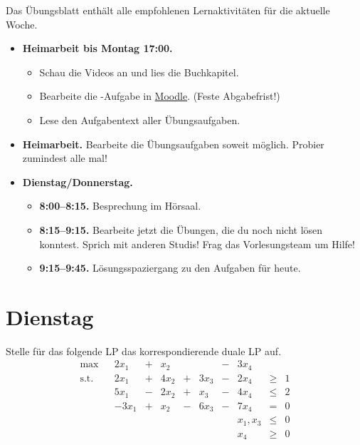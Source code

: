 \documentclass{uebung_cs}
\begin{document}
Das Übungsblatt enthält alle empfohlenen Lernaktivitäten für die aktuelle Woche.

\begin{itemize}
\item \textbf{Heimarbeit bis Montag 17:00.}
    \begin{itemize}
    \item 
    Schau die Videos an und lies die Buchkapitel.
    \item Bearbeite die -Aufgabe in \href{https://moodle.studiumdigitale.uni-frankfurt.de/moodle/course/view.php?id=2241}{Moodle}. (Feste Abgabefrist!)
    \item Lese den Aufgabentext aller Übungsaufgaben.
    \end{itemize}
\item \textbf{Heimarbeit.} Bearbeite die Übungsaufgaben soweit möglich. Probier zumindest alle mal!
\item \textbf{Dienstag/Donnerstag.}
\begin{itemize}
    \item \textbf{8:00--8:15.} Besprechung im Hörsaal.
    \item \textbf{8:15--9:15.} Bearbeite jetzt die Übungen, die du noch nicht lösen konntest. Sprich mit anderen Studis! Frag das Vorlesungsteam um Hilfe!
    \item \textbf{9:15--9:45.} Lösungsspaziergang zu den Aufgaben für heute.
\end{itemize}
\end{itemize}

\section*{Dienstag}

\begin{aufgabe}
	Stelle für das folgende \acs{LP} das korrespondierende duale \acs{LP} auf.
	\[
		\begin{array}{rrrlllllllll}
		\text{max}    &     &   2 x_1       &   +     &   x_2   &       &         &   -   & 3x_4  &         &   \\
		\text{s.t.}  &     &   2x_1      &   +     &   4x_2  &   +   &  3 x_3   &   -   & 2x_4   &  \geq   & 1 \\
							&     &   5x_1      &   -     &   2x_2   &   +   &   x_3  &   -   & 4x_4  &  \leq   & 2 \\
							&     &   -3x_1     & +     &   x_2  &   -   &   6x_3  &   -   & 7 x_4   &   =     & 0 \\
							&     &           &       &         &       &       &         &x_1,x_3   & \leq    &   0      \\
							&     &          &       &         &       &       &         &  x_4       & \geq    &   0    
		\end{array}
	\]
	
\end{aufgabe}
\end{document}
